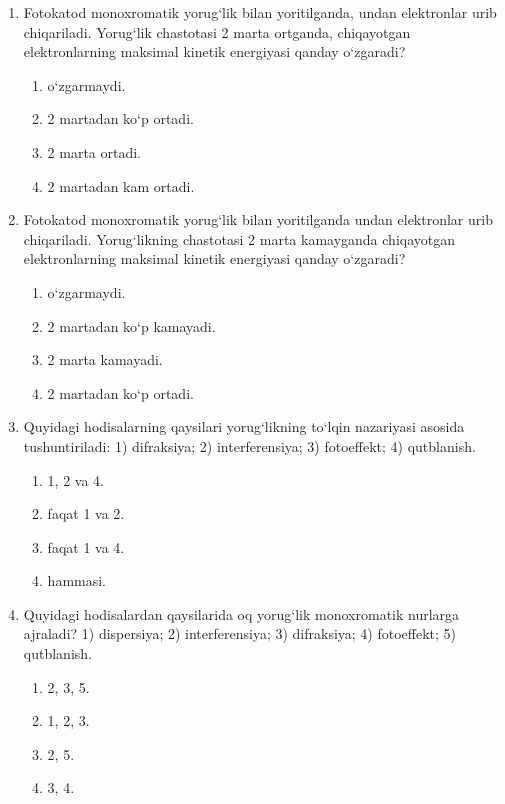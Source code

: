 \begin{enumerate}
\begin{enumerate}[label=\Alph*)]
\item 4.
\item 3.
\item 2.
\item 1.
\end{enumerate}

\setcounter{enumi}{18}
\item Fotokatod monoxromatik yorug‘lik bilan yoritilganda, undan elektronlar urib chiqariladi. Yorug‘lik chastotasi 2 marta ortganda, chiqayotgan elektronlarning maksimal kinetik energiyasi qanday o‘zgaradi?
\begin{enumerate}[label=\Alph*)]
\item o‘zgarmaydi.
\item 2 martadan ko‘p ortadi.
\item 2 marta ortadi.
\item 2 martadan kam ortadi.
\end{enumerate}

\item Fotokatod monoxromatik yorug‘lik bilan yoritilganda undan elektronlar urib chiqariladi. Yorug‘likning chastotasi 2 marta kamayganda chiqayotgan elektronlarning maksimal kinetik energiyasi qanday o‘zgaradi?
\begin{enumerate}[label=\Alph*)]
\item o‘zgarmaydi.
\item 2 martadan ko‘p kamayadi.
\item 2 marta kamayadi.
\item 2 martadan ko‘p ortadi.
\end{enumerate}

\item Quyidagi hodisalarning qaysilari yorug‘likning to‘lqin nazariyasi asosida tushuntiriladi:
1) difraksiya; 2) interferensiya; 3) fotoeffekt; 4) qutblanish.
\begin{enumerate}[label=\Alph*)]
\item 1, 2 va 4.
\item faqat 1 va 2.
\item faqat 1 va 4.
\item hammasi.
\end{enumerate}

\item Quyidagi hodisalardan qaysilarida oq yorug‘lik monoxromatik nurlarga ajraladi?
1) dispersiya; 2) interferensiya; 3) difraksiya; 4) fotoeffekt; 5) qutblanish.
\begin{enumerate}[label=\Alph*)]
\item 2, 3, 5.
\item 1, 2, 3.
\item 2, 5.
\item 3, 4.
\end{enumerate}


\end{enumerate}

